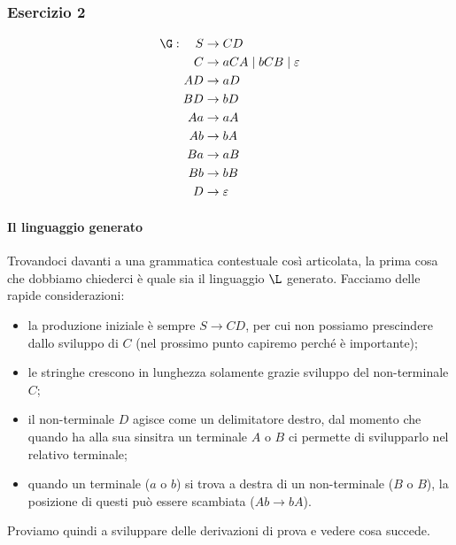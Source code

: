 \documentclass[class=book, crop=false, oneside, 12pt]{standalone}
\begin{document}
  \subsubsection{Esercizio 2}
  \begin{align*}
    \G: \quad S &\to CD \\
    C &\to aCA \mid bCB \mid \varepsilon \\
    AD &\to aD \\
    BD &\to bD \\ \notag
    Aa &\to aA \\
    Ab &\to bA \\ \notag
    Ba &\to aB \\ \notag
    Bb &\to bB \\ \notag
    D &\to \varepsilon \notag
  \end{align*}
  \paragraph{Il linguaggio generato}
  Trovandoci davanti a una grammatica contestuale così articolata, la prima cosa che dobbiamo chiederci è quale sia il linguaggio \(\L\) generato. Facciamo delle rapide considerazioni:
  \begin{itemize}
    \item la produzione iniziale è sempre \(S \to CD\), per cui non possiamo prescindere dallo sviluppo di \(C\) (nel prossimo punto capiremo perché è importante);
    \item le stringhe crescono in lunghezza solamente grazie sviluppo del non-terminale \(C\);
    \item il non-terminale \(D\) agisce come un delimitatore destro, dal momento che quando ha alla sua sinsitra un terminale \(A\) o \(B\) ci permette di svilupparlo nel relativo terminale;
    \item quando un terminale (\(a\) o \(b\)) si trova a destra di un non-terminale (\(B\) o \(B\)), la posizione di questi può essere scambiata (\(Ab \to bA\)).
  \end{itemize}
  Proviamo quindi a sviluppare delle derivazioni di prova e vedere cosa succede.
\end{document}
